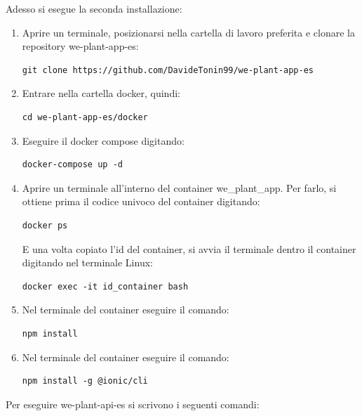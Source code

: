 \documentclass[a4paper]{article}
\begin{document}
	Adesso si esegue la seconda installazione:
	\begin{enumerate}
		\item Aprire un terminale, posizionarsi nella cartella di lavoro preferita e clonare la repository \textsf{we-plant-app-es}:
		\begin{lstlisting}
git clone https://github.com/DavideTonin99/we-plant-app-es\end{lstlisting}
		
		\item Entrare nella cartella docker, quindi:
		\begin{lstlisting}
cd we-plant-app-es/docker\end{lstlisting}
		
		\item Eseguire il \textsf{docker compose} digitando:
		\begin{lstlisting}
docker-compose up -d\end{lstlisting}
		
		\item Aprire un terminale all'interno del container \textsf{we\_plant\_app}. Per farlo, si ottiene prima il codice univoco del container digitando:
		\begin{lstlisting}
docker ps\end{lstlisting}
		E una volta copiato l'id del container, si avvia il terminale dentro il container digitando nel terminale Linux:
		\begin{lstlisting}
docker exec -it id_container bash\end{lstlisting}
		
		\item Nel terminale del container eseguire il comando:
		\begin{lstlisting}
npm install\end{lstlisting}
		
		\item Nel terminale del container eseguire il comando:
		\begin{lstlisting}
npm install -g @ionic/cli\end{lstlisting}
	\end{enumerate}
	Per eseguire \textsf{we-plant-api-es} si scrivono i seguenti comandi:
\end{document}
